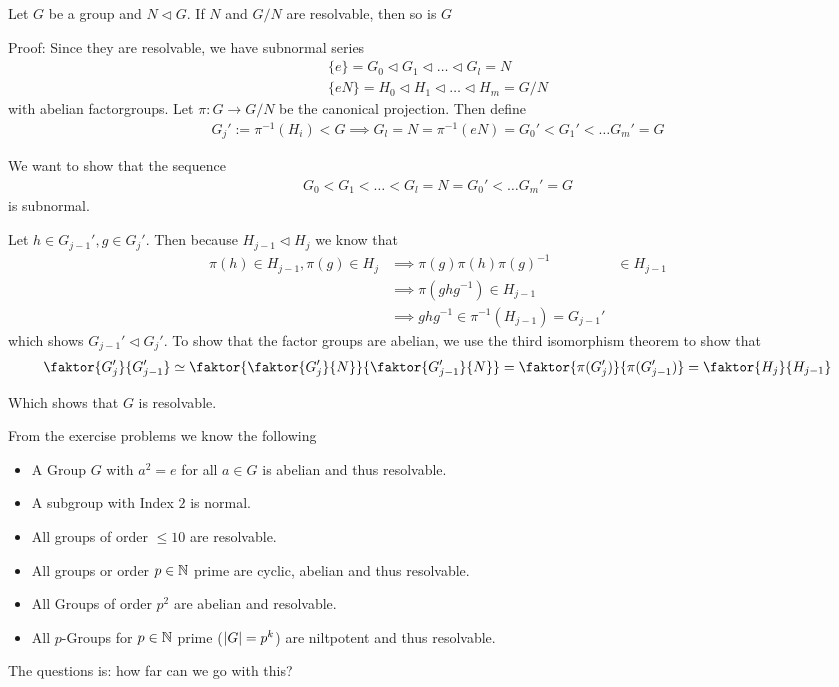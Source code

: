 \begin{proposition}[]
Let $G$ be a group and $N \lhd G$. If $N$ and $G/N$ are resolvable, then so is $G$
\end{proposition}
Proof: Since they are resolvable, we have subnormal series
\begin{align*}
	\{e\} = G_0 \lhd G_1 \lhd \ldots \lhd G_l = N\\
	\{eN\} = H_0 \lhd H_1 \lhd \ldots \lhd H_m = G/N
\end{align*}
with abelian factorgroups. Let $\pi: G \to G/N$ be the canonical projection. Then define
\begin{align*}
	G_j' := \pi^{-1}(H_i) < G	 \implies G_l = N = \pi^{-1}(eN) = G_0' < G_1' < \ldots G_m' = G
\end{align*}

We want to show that the sequence
\begin{align*}
	G_0 < G_1 < \ldots < G_l = N = G_0' < \ldots G_m' = G
\end{align*}
is subnormal.

Let $h \in G_{j-1}',g \in G_j'$. Then because $H_{j-1} \lhd H_j$ we know that
\begin{align*}
	\pi(h) \in H_{j-1}, \pi(g) \in H_j &\implies \pi(g)\pi(h)\pi(g)^{-1} &\in H_{j-1}\\
																		 &\implies \pi(ghg^{-1}) \in H_{j-1}\\
																		 &\implies ghg^{-1} \in \pi^{-1}(H_{j-1}) = G_{j-1}'
\end{align*}
which shows $G_{j-1}' \lhd G_j'$. To show that the factor groups are abelian, we use the third isomorphism theorem to show that
\begin{align*}
	\faktor{G_j'}{G_{j-1}'} \simeq \faktor{\faktor{G_j'}{N}}{\faktor{G_{j-1}'}{N}} = \faktor{\pi(G_j')}{\pi(G_{j-1}')} = \faktor{H_j}{H_{j-1}}
\end{align*}

Which shows that $G$ is resolvable.

From the exercise problems we know the following
\begin{itemize}
	\item A Group $G$ with $a^{2} = e$ for all $a \in G$ is abelian and thus resolvable.
	\item A subgroup with Index $2$ is normal.
	\item All groups of order $\leq 10$ are resolvable.
	\item All groups or order $p \in \mathbb{N}$ prime are cyclic, abelian and thus resolvable.
	\item All Groups of order $p^{2}$ are abelian and resolvable.
	\item All $p$-Groups for $p \in \mathbb{N}$ prime ($\vert G\vert = p^{k}$) are niltpotent and thus resolvable.
\end{itemize}

The questions is: how far can we go with this?








 


